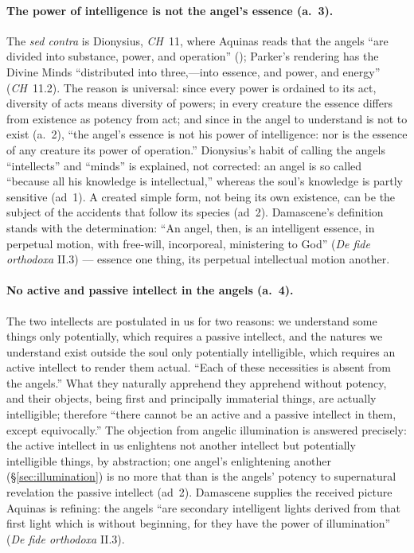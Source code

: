 \paragraph{The power of intelligence is not the angel's essence (a.~3).}
The \emph{sed contra} is Dionysius, \emph{CH}~11, where Aquinas reads that
the angels ``are divided into substance, power, and operation''
(); Parker's
rendering has the Divine Minds ``distributed into three,---into essence,
and power, and energy'' (\emph{CH}~11.2). The reason is universal: since
every power is ordained to its act, diversity of acts means diversity of
powers; in every creature the essence differs from existence as potency
from act; and since in the angel to understand is not to exist (a.~2),
``the angel's essence is not his power of intelligence: nor is the essence
of any creature its power of operation.'' Dionysius's habit of calling the
angels ``intellects'' and ``minds'' is explained, not corrected: an angel
is so called ``because all his knowledge is intellectual,'' whereas the
soul's knowledge is partly sensitive (ad~1). A created simple form, not
being its own existence, can be the subject of the accidents that follow
its species (ad~2). Damascene's definition stands with the determination:
``An angel, then, is an intelligent essence, in perpetual motion, with
free-will, incorporeal, ministering to God'' (\emph{De fide orthodoxa}
II.3) --- essence one thing, its perpetual intellectual motion another.

\paragraph{No active and passive intellect in the angels (a.~4).} The two
intellects are postulated in us for two reasons: we understand some things
only potentially, which requires a passive intellect, and the natures we
understand exist outside the soul only potentially intelligible, which
requires an active intellect to render them actual. ``Each of these
necessities is absent from the angels.'' What they naturally apprehend
they apprehend without potency, and their objects, being first and
principally immaterial things, are actually intelligible; therefore ``there
cannot be an active and a passive intellect in them, except equivocally.''
The objection from angelic illumination is answered precisely: the active
intellect in us enlightens not another intellect but potentially
intelligible things, by abstraction; one angel's enlightening another
(\S\ref{sec:illumination}) is no more that than is the angels' potency to
supernatural revelation the passive intellect (ad~2). Damascene supplies
the received picture Aquinas is refining: the angels ``are secondary
intelligent lights derived from that first light which is without
beginning, for they have the power of illumination'' (\emph{De fide
orthodoxa} II.3).

